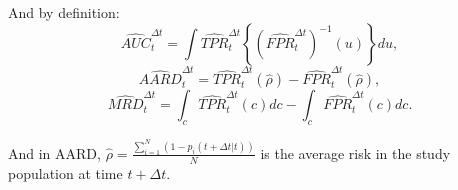 And by definition:
\begin{equation*}\label{p3est_pAUC}
\widehat{AUC}_t^{\Delta t} = \int \widehat{TPR}_t^{\Delta t}\left\{ (\widehat{FPR}_t^{\Delta t})^{-1}(u)\right\}du,
\end{equation*}
\begin{equation*}\label{p3est_pAARD}
\widehat{AARD}_t^{\Delta t} = \widehat{TPR}_t^{\Delta t}(\hat{\rho}) - \widehat{FPR}_t^{\Delta t}(\hat{\rho}),
\end{equation*}
\begin{equation*}\label{p3est_pMRD}
\widehat{MRD}_t^{\Delta t} = \int_c \widehat{TPR}_t^{\Delta t}(c)dc - \int_c \widehat{FPR}_t^{\Delta t}(c)dc.
\end{equation*}

And in AARD, $\hat{\rho} = \frac{\sum_{i=1}^N (1-\hat{p}_i(t+\Delta t| t))}{N}$ is the average risk in the study population at time $t+\Delta t$.




%
%
% 


% 
